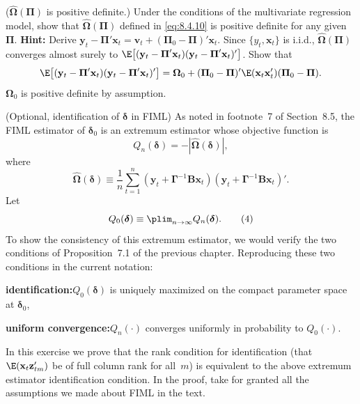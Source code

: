 \begin{problemset}
\exercise[2]
($\hat{\boldsymbol{\Omega}}(\boldsymbol{\Pi})$ is positive definite.)\quad
Under the conditions of the multivariate regression model, show that $\hat{\boldsymbol{\Omega}}(\boldsymbol{\Pi})$ defined in \eqref{eq:8.4.10} is positive definite for any
given $\boldsymbol{\Pi}$. \textbf{Hint:} Derive
$\mathbf{y}_t - \boldsymbol{\Pi}'\mathbf{x}_t = \mathbf{v}_t + (\boldsymbol{\Pi}_0 - \boldsymbol{\Pi})'\mathbf{x}_t$.
Since $\{y_t, \mathbf{x}_t\}$ is i.i.d.,
$\hat{\boldsymbol{\Omega}}(\boldsymbol{\Pi})$ converges almost surely to
$\E\bigl[(\mathbf{y}_t - \boldsymbol{\Pi}'\mathbf{x}_t)(\mathbf{y}_t - \boldsymbol{\Pi}'\mathbf{x}_t)'\bigr]$.
Show that
\[
  \E\bigl[(\mathbf{y}_t - \boldsymbol{\Pi}'\mathbf{x}_t)
    (\mathbf{y}_t - \boldsymbol{\Pi}'\mathbf{x}_t)'\bigr]
  = \boldsymbol{\Omega}_0
    + (\boldsymbol{\Pi}_0 - \boldsymbol{\Pi})'\E(\mathbf{x}_t\mathbf{x}_t')
      (\boldsymbol{\Pi}_0 - \boldsymbol{\Pi}).
\]
$\boldsymbol{\Omega}_0$ is positive definite by assumption.

\exercise[3]
(Optional, identification of $\boldsymbol{\delta}$ in FIML)\quad
As noted in footnote~7 of Section~8.5,
the FIML estimator of $\boldsymbol{\delta}_0$ is an extremum estimator whose objective function is
\begin{equation}
  Q_n(\boldsymbol{\delta}) = -|\hat{\boldsymbol{\Omega}}(\boldsymbol{\delta})|,
  \tag{2}
\end{equation}
where
\begin{equation}
  \hat{\boldsymbol{\Omega}}(\boldsymbol{\delta})
  \equiv \frac{1}{n}\sum_{t=1}^{n}
    (\mathbf{y}_t + \boldsymbol{\Gamma}^{-1}\mathbf{B}\mathbf{x}_t)
    (\mathbf{y}_t + \boldsymbol{\Gamma}^{-1}\mathbf{B}\mathbf{x}_t)'.
  \tag{3}
\end{equation}
Let
\begin{equation}
  Q_0(\boldsymbol{\delta}) \equiv \plim_{n \to \infty} Q_n(\boldsymbol{\delta}).
  \tag{4}
\end{equation}
To show the consistency of this extremum estimator, we would verify the two
conditions of Proposition~7.1 of the previous chapter. Reproducing these two
conditions in the current notation:

\medskip
\noindent\textbf{identification:}\quad $Q_0(\boldsymbol{\delta})$ is uniquely maximized on the compact parameter space
at $\boldsymbol{\delta}_0$,

\medskip
\noindent\textbf{uniform convergence:}\quad $Q_n(\cdot)$ converges uniformly in probability to $Q_0(\cdot)$.

\medskip
In this exercise we prove that the rank condition for identification (that
$\E(\mathbf{x}_t\mathbf{z}_{tm}')$
be of full column rank for all~$m$) is equivalent to the above extremum estimator
identification condition. In the proof, take for granted all the assumptions we
made about FIML in the text.


\end{problemset}
